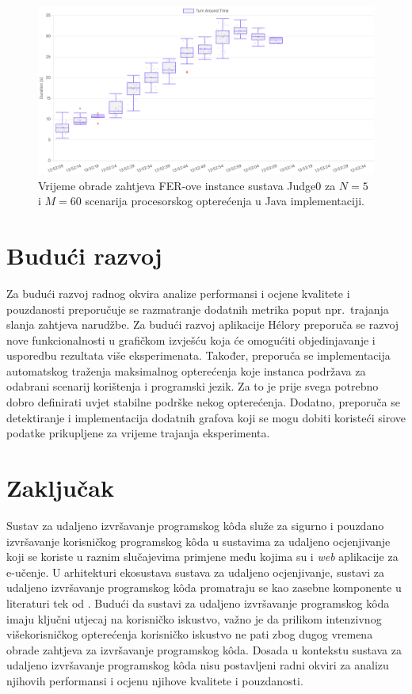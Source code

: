 \documentclass[times, utf8, diplomski]{fer}
\begin{document}
\begin{figure}[htb]
	\centering
	\includegraphics[width=\textwidth]{images/Judge0 FER TAT for CPU Intensive Java 5x60 5s.png}
	\caption{
		Vrijeme obrade zahtjeva FER-ove instance sustava Judge0 za $N=5$ i $M=60$ scenarija procesorskog opterećenja u Java implementaciji.
	}
	\label{fig:judge0-fer-5}
\end{figure}

\chapter{Budući razvoj}
\label{chap:future}
Za budući razvoj radnog okvira analize performansi i ocjene kvalitete i pouzdanosti preporučuje se razmatranje dodatnih metrika poput npr.\ trajanja slanja zahtjeva narudžbe. Za budući razvoj aplikacije Hélory preporuča se razvoj nove funkcionalnosti u grafičkom izvješću koja će omogućiti objedinjavanje i usporedbu rezultata više eksperimenata. Također, preporuča se implementacija automatskog traženja maksimalnog opterećenja koje instanca podržava za odabrani scenarij korištenja i programski jezik. Za to je prije svega potrebno dobro definirati uvjet stabilne podrške nekog opterećenja. Dodatno, preporuča se detektiranje i implementacija dodatnih grafova koji se mogu dobiti koristeći sirove podatke prikupljene za vrijeme trajanja eksperimenta.

\chapter{Zaključak}
Sustav za udaljeno izvršavanje programskog kôda služe za sigurno i pouzdano izvršavanje korisničkog programskog kôda u sustavima za udaljeno ocjenjivanje koji se koriste u raznim slučajevima primjene među kojima su i \textit{web} aplikacije za e-učenje. U arhitekturi ekosustava sustava za udaljeno ocjenjivanje, sustavi za udaljeno izvršavanje programskog kôda promatraju se kao zasebne komponente u literaturi tek od \citep{9245310}. Budući da sustavi za udaljeno izvršavanje programskog kôda imaju ključni utjecaj na korisničko iskustvo, važno je da prilikom intenzivnog višekorisničkog opterećenja korisničko iskustvo ne pati zbog dugog vremena obrade zahtjeva za izvršavanje programskog kôda. Dosada u kontekstu sustava za udaljeno izvršavanje programskog kôda nisu postavljeni radni okviri za analizu njihovih performansi i ocjenu njihove kvalitete i pouzdanosti.
\end{document}
